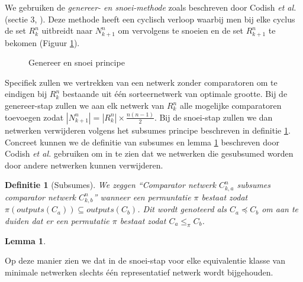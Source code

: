 \documentclass{article}
\newtheorem{lemma}{Lemma}
\newtheorem{definitie}{Definitie}
\begin{document}
We gebruiken de \textit{genereer- en snoei-methode} zoals beschreven door Codish \textit{et al.} (sectie 3, \cite{sortingNetworksSize2014}).
Deze methode heeft een cyclisch verloop waarbij men bij elke cyclus de set $R^n_k$ uitbreidt naar $N^n_{k+1}$ om vervolgens te snoeien en de set $R^n_{k+1}$ te bekomen (Figuur \ref{GenereerSnoei}).
\begin{figure}[!h]
\centering
{}
\caption{Genereer en snoei principe}
\label{GenereerSnoei}
\end{figure}
Specifiek zullen we vertrekken van een netwerk zonder comparatoren om te eindigen bij $R^n_k$ bestaande uit \'e\'en sorteernetwerk van optimale grootte.
Bij de genereer-stap zullen we aan elk netwerk van $R^n_k$ alle mogelijke comparatoren toevoegen zodat $|N^n_{k+1}| = |R^n_{k}| \times \frac{n\left(n-1\right)}{2}$.
Bij de snoei-stap zullen we dan netwerken verwijderen volgens het subsumes principe beschreven in definitie \ref{definitie1}.
Concreet kunnen we de definitie van subsumes en lemma \ref{lemma2} beschreven door Codish \textit{et al.} \cite{sortingNetworksSize2014} gebruiken om in te zien dat we netwerken die gesubsumed worden door andere netwerken kunnen verwijderen.
\begin{definitie}[Subsumes] %
We zeggen ``Comparator netwerk $C^n_{k,a}$ subsumes comparator netwerk $C^n_{k,b}$'' wanneer een permuntatie $\pi$ bestaat zodat $\pi\left(outputs\left(C_{a}\right)\right) \subseteq outputs\left(C_{b}\right)$. Dit wordt genoteerd als $ C_{a} \preceq C_{b}$ om aan te duiden dat er een permutatie $\pi$ bestaat zodat $C_{a}\leq_\pi C_{b}$. %
\label{definitie1}
\end{definitie}
\begin{lemma}
\label{lemma2}
\end{lemma}
Op deze manier zien we dat in de snoei-stap voor elke equivalentie klasse van minimale netwerken slechts \'e\'en representatief netwerk wordt bijgehouden.
\end{document}

